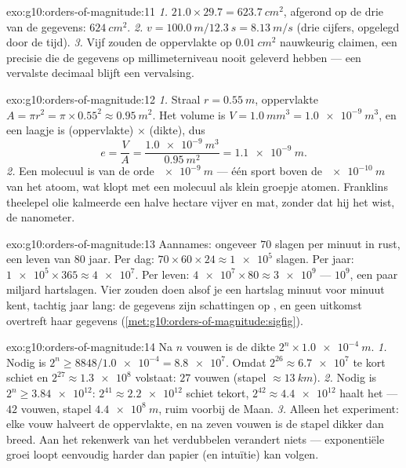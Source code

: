 \begin{solution}{exo:g10:orders-of-magnitude:11}
\emph{1.} $21.0 \times 29.7 = \qty{623.7}{cm^2}$, afgerond op de drie
 van de gegevens: $\qty{624}{cm^2}$.
\emph{2.} $v = \qty{100.0}{m}/\qty{12.3}{s} = \qty{8.13}{m/s}$ (drie
cijfers, opgelegd door de tijd).
\emph{3.} Vijf  zouden de oppervlakte op
$\qty{0.01}{cm^2}$ nauwkeurig claimen, een precisie die de gegevens op
millimeterniveau nooit geleverd hebben --- een vervalste decimaal
blijft een vervalsing.
\end{solution}

\begin{solution}{exo:g10:orders-of-magnitude:12}
\emph{1.} Straal $r = \qty{0.55}{m}$, oppervlakte
$A = \pi r^{2} = \pi \times 0.55^{2} \approx \qty{0.95}{m^2}$. Het
volume is $V = \qty{1.0}{mm^3} = \qty{1.0e-9}{m^3}$, en een laagje is
(oppervlakte) $\times$ (dikte), dus
\[
e = \frac{V}{A} = \frac{\qty{1.0e-9}{m^3}}{\qty{0.95}{m^2}}
= \qty{1.1e-9}{m} .
\]
\emph{2.} Een molecuul is van de orde $\qty{e-9}{m}$ --- één sport
boven de $\qty{e-10}{m}$ van het atoom, wat klopt met een molecuul als
klein groepje atomen. Franklins theelepel olie kalmeerde een halve
hectare vijver en mat, zonder dat hij het wist, de nanometer.
\end{solution}

\begin{solution}{exo:g10:orders-of-magnitude:13}
Aannames: ongeveer $70$ slagen per minuut in rust, een leven van $80$
jaar. Per dag: $70 \times 60 \times 24 \approx \num{1e5}$ slagen. Per
jaar: $\num{1e5} \times 365 \approx \num{4e7}$. Per leven:
$\num{4e7} \times 80 \approx \num{3e9}$ ---  $10^{9}$, een
paar miljard hartslagen. Vier  zouden doen alsof je
een hartslag minuut voor minuut kent, tachtig jaar lang: de gegevens
zijn schattingen op , en geen uitkomst overtreft haar
gegevens (\cref{met:g10:orders-of-magnitude:sigfig}).
\end{solution}

\begin{solution}{exo:g10:orders-of-magnitude:14}
Na $n$ vouwen is de dikte $2^{n} \times \qty{1.0e-4}{m}$.
\emph{1.} Nodig is $2^{n} \geq 8848/\num{1.0e-4} = \num{8.8e7}$. Omdat
$2^{26} \approx \num{6.7e7}$ te kort schiet en
$2^{27} \approx \num{1.3e8}$ volstaat: $27$ vouwen (stapel
$\approx \qty{13}{km}$).
\emph{2.} Nodig is $2^{n} \geq \num{3.84e12}$: $2^{41} \approx
\num{2.2e12}$ schiet tekort, $2^{42} \approx \num{4.4e12}$ haalt het
--- $42$ vouwen, stapel $\qty{4.4e8}{m}$, ruim voorbij de Maan.
\emph{3.} Alleen het experiment: elke vouw halveert de oppervlakte, en
na zeven vouwen is de stapel dikker dan breed. Aan het rekenwerk van
het verdubbelen verandert niets --- exponentiële groei loopt eenvoudig
harder dan papier (en intuïtie) kan volgen.
\end{solution}

